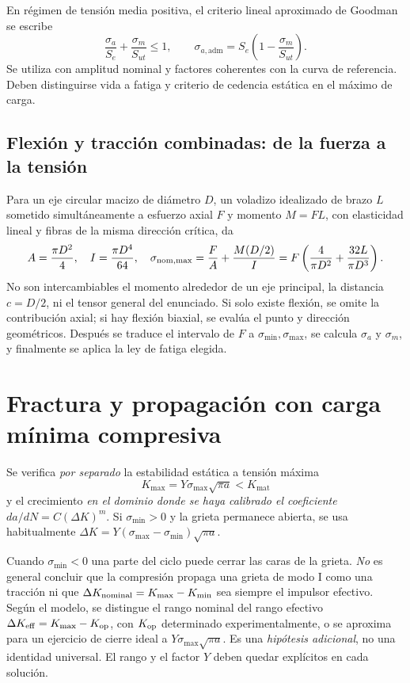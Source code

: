 En régimen de tensión media positiva, el criterio lineal aproximado de Goodman se escribe
\[
\frac{\sigma_a}{S_e}+\frac{\sigma_m}{S_{ut}}\leq1,\qquad
\sigma_{a,\mathrm{adm}}=S_e\left(1-\frac{\sigma_m}{S_{ut}}\right).
\]
Se utiliza con amplitud nominal y factores coherentes con la curva de referencia. Deben distinguirse vida a fatiga y criterio de cedencia estática en el máximo de carga.

\subsection{Flexión y tracción combinadas: de la fuerza a la tensión}
Para un eje circular macizo de diámetro $D$, un voladizo idealizado de brazo $L$ sometido simultáneamente a esfuerzo axial $F$ y momento $M=FL$, con elasticidad lineal y fibras de la misma dirección crítica, da
\begin{equation}
A=\frac{\pi D^2}{4},\quad I=\frac{\pi D^4}{64},\quad
\sigma_{\rm nom,max}= \frac FA+\frac{M(D/2)}I=
F\left(\frac4{\pi D^2}+\frac{32L}{\pi D^3}\right).
\label{eq:puente-flexion}
\end{equation}
No son intercambiables el momento alrededor de un eje principal, la distancia $c=D/2$, ni el tensor general del enunciado. Si solo existe flexión, se omite la contribución axial; si hay flexión biaxial, se evalúa el punto y dirección geométricos. Después se traduce el intervalo de $F$ a $\sigma_{\min},\sigma_{\max}$, se calcula $\sigma_a$ y $\sigma_m$, y finalmente se aplica la ley de fatiga elegida.

\section{Fractura y propagación con carga mínima compresiva}
Se verifica \emph{por separado} la estabilidad estática a tensión máxima
\[
K_{\max}=Y\sigma_{\max}\sqrt{\pi a}<K_{\mathrm{mat}}
\]
y el crecimiento \emph{en el dominio donde se haya calibrado el coeficiente} $da/dN=C(\Delta K)^m$. Si $\sigma_{\min}>0$ y la grieta permanece abierta, se usa habitualmente $\Delta K=Y(\sigma_{\max}-\sigma_{\min})\sqrt{\pi a}$.

Cuando $\sigma_{\min}<0$ una parte del ciclo puede cerrar las caras de la grieta. \emph{No} es general concluir que la compresión propaga una grieta de modo I como una tracción ni que $\Delta K_{\rm nominal}=K_{\max}-K_{\min}$ sea siempre el impulsor efectivo. Según el modelo, se distingue el rango nominal del rango efectivo $\Delta K_{\rm eff}=K_{\max}-K_{\rm op}$, con $K_{\rm op}$ determinado experimentalmente, o se aproxima para un ejercicio de cierre ideal a $Y\sigma_{\max}\sqrt{\pi a}$. Es una \emph{hipótesis adicional}, no una identidad universal. El rango y el factor $Y$ deben quedar explícitos en cada solución.

